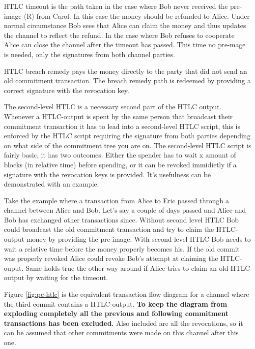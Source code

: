 HTLC timeout is the path taken in the case where Bob never received the pre-image (R) from Carol. In this case the money should be refunded to Alice. Under normal circumstance Bob sees that Alice can claim the money and thus updates the channel to reflect the refund. In the case where Bob refuses to cooperate Alice can close the channel after the timeout has passed. This time no pre-mage is needed, only the signatures from both channel parties.

HTLC breach remedy pays the money directly to the party that did not send an old commitment transaction. The breach remedy path is redeemed by providing a correct signature with the revocation key.

The second-level HTLC is a necessary second part of the HTLC output. Whenever a HTLC-output is spent by the same person that broadcast their commitment transaction it has to lead into a second-level HTLC script, this is enforced by the HTLC script requiring the signature from both parties depending on what side of the commitment tree you are on. The second-level HTLC script is fairly basic, it has two outcomes. Either the spender has to wait x amount of blocks (in relative time) before spending, or it can be revoked immidietly if a signature with the revocation keys is provided. It's usefulness can be demonstrated with an example:

Take the example where a transaction from Alice to Eric passed through a channel between Alice and Bob. Let's say a couple of days passed and Alice and Bob has exchanged other transactions since. Without second level HTLC Bob could broadcast the old commitment transaction and try to claim the HTLC-output money by providing the pre-image. With second-level HTLC Bob needs to wait a relative time before the money properly becomes his. If the old commit was properly revoked Alice could revoke Bob's attempt at claiming the HTLC-ouput. Same holds true the other way around if Alice tries to claim an old HTLC output by waiting for the timeout.

Figure \ref{fig:pc-htlc} is the equivalent transaction flow diagram for a channel where the third commit contains a HTLC-output. \textbf{To keep the diagram from exploding completely all the previous and following commitment transactions has been excluded.} Also included are all the revocations, so it can be assumed that other commitments were made on this channel after this one.  

